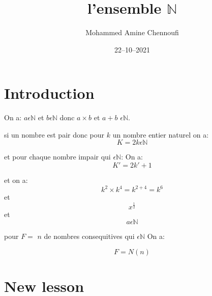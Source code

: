 \documentclass[14pt]{extarticle}
\title{l'ensemble $\mathbb{N}$}
\date{22--10--2021}
\author{Mohammed Amine Chennoufi}
\begin{document}
\maketitle
\newpage
{}
\section{Introduction}
On a: $ a {\epsilon} {\mathbb{N}}$ et $b \epsilon {\mathbb{N}}$
donc $ a \times b $ et $ a+b$ $ \epsilon {\mathbb{N}}$.


si un nombre est pair donc pour $k$ un nombre entier naturel on a: 
\[K=2k \epsilon \mathbb{N}\]


et pour chaque nombre impair qui $\epsilon {\mathbb{N}}$:
On a: 
\[K' = 2k'+ 1\]

et on a: \[k^2 \times k^4 = k^{2+4} = k^6\]
et 
\[x^{\frac{1}{2}}\]
et 
\[a \epsilon {\mathbb{N}} \]

pour $F = $ $n$ de nombres consequitives qui $\epsilon \mathbb{N}$ On a: 

\[ F = N(n)\]

\newpage

\section{New lesson}
\end{document}
